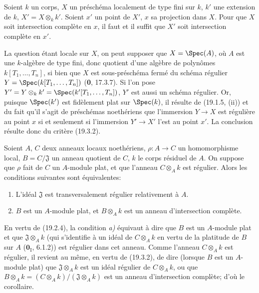 \begin{corollary}[19.3.4]
\label{IV.19.3.4}
Soient $k$ un corps, $X$ un préschéma localement de type fini sur $k$, $k'$ une extension de $k$, $X'=X\otimes_k k'$. Soient $x'$ un point de $X'$, $x$ sa projection dans $X$. Pour que $X$ soit intersection complète en $x$, il faut et il suffit que $X'$ soit intersection complète en $x'$.
\end{corollary}

La question étant locale sur $X$, on peut supposer que $X=\Spec(A)$, où $A$ est une $k$-algèbre de type fini, donc quotient d'une algèbre de polynômes $k[T_1,\ldots,T_n]$, si bien que $X$ est sous-préschéma fermé du schéma régulier $Y=\Spec(k[T_1,\ldots,T_n])$ (\textbf{0}, 17.3.7). Si l'on pose $Y'=Y\otimes_k k'=\Spec(k'[T_1,\ldots,T_n])$, $Y'$ est aussi un schéma régulier. Or, puisque $\Spec(k')$ est fidèlement plat sur $\Spec(k)$, il résulte de (19.1.5, (ii)) et du fait qu'il s'agit de préschémas noethériens que l'immersion $Y\to X$ est régulière au point $x$ si et seulement si l'immersion $Y'\to X'$ l'est au point $x'$. La conclusion résulte donc du critère (19.3.2).

\begin{corollary}[19.3.5]
\label{IV.19.3.5}
Soient $A$, $C$ deux anneaux locaux noethériens, $\rho:A\to C$ un homomorphisme local, $B=C/\mathfrak J$ un anneau quotient de $C$, $k$ le corps résiduel de $A$. On suppose que $\rho$ fait de $C$ un $A$-module plat, et que l'anneau $C\otimes_A k$ est régulier. Alors les conditions suivantes sont équivalentes:
\begin{enumerate}
  \item[\textup{a)}] L'idéal $\mathfrak J$ est transversalement régulier relativement à $A$.
  \item[\textup{b)}] $B$ est un $A$-module plat, et $B\otimes_A k$ est un anneau d'intersection complète.
\end{enumerate}
\end{corollary}


En vertu de (19.2.4), la condition \emph{a)} équivaut à dire que $B$ est un $A$-module plat et que $\mathfrak J\otimes_A k$ (qui s'identifie à un idéal de $C\otimes_A k$ en vertu de la platitude de $B$ sur $A$ ($\mathbf{0}_{\mathrm I}$, 6.1.2)) est régulier dans cet anneau. Comme l'anneau $C\otimes_A k$ est régulier, il revient au même, en vertu de (19.3.2), de dire (lorsque $B$ est un $A$-module plat) que $\mathfrak J\otimes_A k$ est un idéal régulier de $C\otimes_A k$, ou que $B\otimes_A k=(C\otimes_A k)/(\mathfrak J\otimes_A k)$ est un anneau d'intersection complète; d'où le corollaire.

